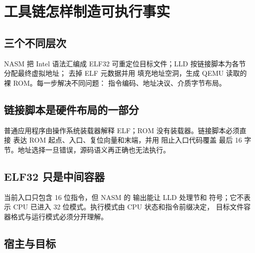 \section{工具链怎样制造可执行事实}

\subsection{三个不同层次}

NASM 把 Intel 语法汇编成 ELF32 可重定位目标文件；LLD 按链接脚本为各节
分配最终虚拟地址； 去掉 ELF 元数据并用
 填充地址空洞，生成 QEMU 读取的裸 ROM。每一步解决不同问题：
指令编码、地址决议、介质字节布局。

\begin{center}
\end{center}

\subsection{链接脚本是硬件布局的一部分}

普通应用程序由操作系统装载器解释 ELF；ROM 没有装载器。链接脚本必须直接
表达 ROM 起点、入口、复位向量和末端，并用  阻止入口代码覆盖
最后 16 字节。地址选择一旦错误，源码语义再正确也无法执行。

\subsection{ELF32 只是中间容器}

当前入口只包含 16 位指令，但 NASM 的  输出能让 LLD 处理节和
符号；它不表示 CPU 已进入 32 位模式。执行模式由 CPU 状态和指令前缀决定，
目标文件容器格式与运行模式必须分开理解。

\subsection{宿主与目标}

